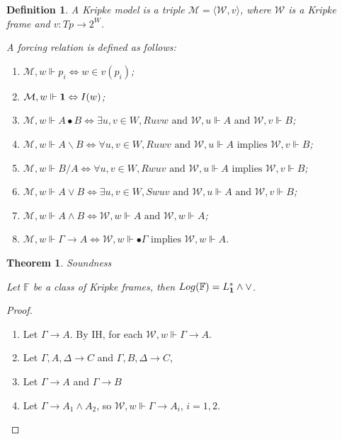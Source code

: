 \documentclass[a4paper]{article}
\theoremstyle{defin}
\newtheorem{defin}{Definition}
\theoremstyle{theorem}
\newtheorem{theorem}{Theorem}
\theoremstyle{prop}
\theoremstyle{lemma}
\theoremstyle{ex}
\theoremstyle{col}
\begin{document}
\begin{defin}
  A Kripke model is a triple $\mathcal{M} = \langle \mathcal{W}, v \rangle$, where
  $\mathcal{W}$ is a Kripke frame and $v : Tp \to 2^W$.

  A forcing relation is defined as follows:

  \begin{enumerate}
    \item $\mathcal{M}, w \Vdash p_i \Leftrightarrow w \in v(p_i)$;
    \item $\mathcal{M}, w \Vdash {\bf 1} \Leftrightarrow I(w)$;
    \item $\mathcal{M}, w \Vdash A \bullet B \Leftrightarrow \exists u, v \in W, R u v w \text{ and } \mathcal{W}, u \Vdash A \text{ and } \mathcal{W}, v \Vdash B$;
    \item $\mathcal{M}, w \Vdash A \backslash B \Leftrightarrow \forall u, v \in W, R u w v \text{ and } \mathcal{W}, u \Vdash A \text{ implies } \mathcal{W}, v \Vdash B$;
    \item $\mathcal{M}, w \Vdash B / A \Leftrightarrow \forall u, v \in W, R w u v \text{ and } \mathcal{W}, u \Vdash A \text{ implies } \mathcal{W}, v \Vdash B$;
    \item $\mathcal{M}, w \Vdash A \lor B \Leftrightarrow \exists u, v \in W, S w u v \text{ and } \mathcal{W}, u \Vdash A \text{ and } \mathcal{W}, v \Vdash B$;
    \item $\mathcal{M}, w \Vdash A \land B \Leftrightarrow \mathcal{W}, w \Vdash A \text{ and } \mathcal{W}, w \Vdash A$;
    \item $\mathcal{M}, w \Vdash \Gamma \rightarrow A \Leftrightarrow \mathcal{W}, w \Vdash \bullet \Gamma \text{ implies } \mathcal{W}, w \Vdash A$.
  \end{enumerate}
\end{defin}

\begin{theorem} Soundness
$ $

  Let $\mathbb{F}$ be a class of Kripke frames, then $Log(\mathbb{F}) = L^{*}_{\bf 1} \land \lor$.
\end{theorem}

\begin{proof}
$ $

  \begin{enumerate}
  \item Let $\Gamma \rightarrow A$. By IH, for each $\mathcal{W}, w \Vdash \Gamma \rightarrow A$.
  \item Let $\Gamma, A, \Delta \rightarrow C$ and $\Gamma, B, \Delta \rightarrow C$,
  \item Let $\Gamma \rightarrow A$ and $\Gamma \rightarrow B$
  \item Let $\Gamma \rightarrow A_1 \land A_2$, so $\mathcal{W}, w \Vdash \Gamma \rightarrow A_i$, $i = 1,2$.
  \end{enumerate}
\end{proof}
\end{document}
